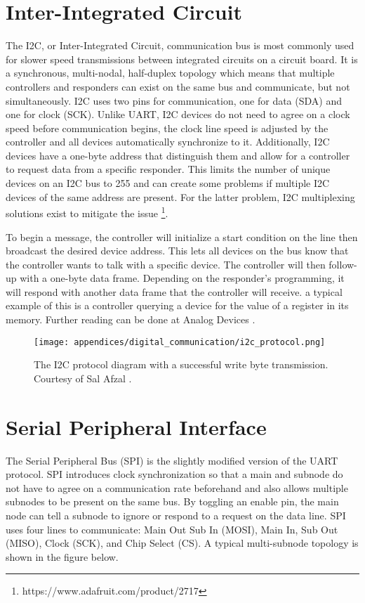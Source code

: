 \section[I2C Explained]{Inter-Integrated Circuit} 
The I2C, or Inter-Integrated Circuit, communication bus is most commonly used for slower speed transmissions between integrated circuits on a circuit board.
It is a synchronous, multi-nodal, half-duplex topology which means that multiple controllers and responders can exist on the same bus and communicate, but not simultaneously.
I2C uses two pins for communication, one for data (SDA) and one for clock (SCK).
Unlike UART, I2C devices do not need to agree on a clock speed before communication begins, the clock line speed is adjusted by the controller and all devices automatically synchronize to it.
Additionally, I2C devices have a one-byte address that distinguish them and allow for a controller to request data from a specific responder.
This limits the number of unique devices on an I2C bus to 255 and can create some problems if multiple I2C devices of the same address are present.
For the latter problem, I2C multiplexing solutions exist to mitigate the issue \footnote[3]{https://www.adafruit.com/product/2717}.

To begin a message, the controller will initialize a start condition on the line then broadcast the desired device address.
This lets all devices on the bus know that the controller wants to talk with a specific device.
The controller will then follow-up with a one-byte data frame.
Depending on the responder's programming, it will respond with another data frame that the controller will receive.
a typical example of this is a controller querying a device for the value of a register in its memory.
Further reading can be done at Analog Devices \cite{AnalogDevices:I2C}.

\begin{figure}[h!]
    \caption[I2C protocol diagram]{The I2C protocol diagram with a successful write byte transmission. 
    Courtesy of Sal Afzal \cite{AnalogDevices:I2C}.}
    \centering
    \texttt{[image: appendices/digital\_communication/i2c\_protocol.png]}
\end{figure}

\section[SPI Explained]{Serial Peripheral Interface} 
The Serial Peripheral Bus (SPI) is the slightly modified version of the UART protocol.
SPI introduces clock synchronization so that a main and subnode do not have to agree on a communication rate beforehand and also allows multiple subnodes to be present on the same bus.
By toggling an enable pin, the main node can tell a subnode to ignore or respond to a request on the data line.
SPI uses four lines to communicate: Main Out Sub In (MOSI), Main In, Sub Out (MISO), Clock (SCK), and Chip Select (CS).
A typical multi-subnode topology is shown in the figure below.

